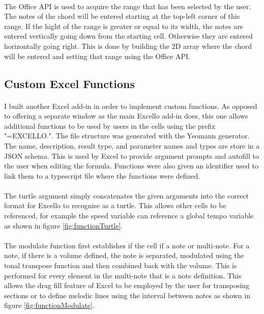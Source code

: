 \paragraph{} The Office API is used to acquire the range that has been selected by the user. The notes of the chord will be entered starting at the top-left corner of this range. If the hight of the range is greater or equal to its width, the notes are entered vertically going down from the starting cell. Otherwise they are entered horizontally going right. This is done by building the 2D array where the chord will be entered and setting that range using the Office API.

\subsection{Custom Excel Functions}

\paragraph{} I built another Excel add-in in order to implement custom functions. As opposed to offering a separate window as the main Excello add-in does, this one allows additional functions to be used by users in the cells using the prefix "=EXCELLO.". The file structure was generated with the Yeomann generator. The name, description, result type, and parameter names and types are store in a JSON schema. This is used by Excel to provide argument prompts and autofill to the user when editing the formula. Functions were also given an identifier used to link them to a typescript file where the functions were defined.

\paragraph{} The turtle argument simply concatenates the given arguments into the correct format for Excello to recognise as a turtle. This allows other cells to be referenced, for example the speed variable can reference a global tempo variable as shown in figure \ref{fig:functionTurtle}.

\paragraph{} The modulate function first establishes if the cell if a note or multi-note. For a note, if there is a volume defined, the note is separated, modulated using the tonal transpose function and then combined back with the volume. This is performed for every element in the multi-note that is a note definition. This allows the drag fill feature of Excel to be employed by the user for transposing sections or to define melodic lines using the interval between notes as shown in figure \ref{fig:functionModulate}.

